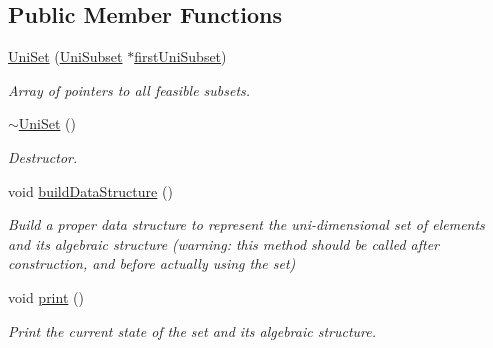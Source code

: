 \subsection*{Public Member Functions}
\begin{DoxyCompactItemize}
\item 
\hyperlink{classUniSet_a7e7a24e0c074fff21442f8ac9c5cd6aa}{Uni\-Set} (\hyperlink{classUniSubset}{Uni\-Subset} $\ast$\hyperlink{classUniSet_a8b2ca464176feddcd8d96c75514eba6b}{first\-Uni\-Subset})
\begin{DoxyCompactList}\small\item\em Array of pointers to all feasible subsets. \end{DoxyCompactList}\item 
\hypertarget{classUniSet_a702d623676d4b30b832bdf17c1768fbe}{\hyperlink{classUniSet_a702d623676d4b30b832bdf17c1768fbe}{$\sim$\-Uni\-Set} ()}\label{classUniSet_a702d623676d4b30b832bdf17c1768fbe}

\begin{DoxyCompactList}\small\item\em Destructor. \end{DoxyCompactList}\item 
\hypertarget{classUniSet_a0ce5a8030b92cbbf2a810eb03bf65846}{void \hyperlink{classUniSet_a0ce5a8030b92cbbf2a810eb03bf65846}{build\-Data\-Structure} ()}\label{classUniSet_a0ce5a8030b92cbbf2a810eb03bf65846}

\begin{DoxyCompactList}\small\item\em Build a proper data structure to represent the uni-\/dimensional set of elements and its algebraic structure (warning\-: this method should be called after construction, and before actually using the set) \end{DoxyCompactList}\item 
\hypertarget{classUniSet_a6a7601a93553783b443f4b4c65e3b1e8}{void \hyperlink{classUniSet_a6a7601a93553783b443f4b4c65e3b1e8}{print} ()}\label{classUniSet_a6a7601a93553783b443f4b4c65e3b1e8}

\begin{DoxyCompactList}\small\item\em Print the current state of the set and its algebraic structure. \end{DoxyCompactList}\end{DoxyCompactItemize}
